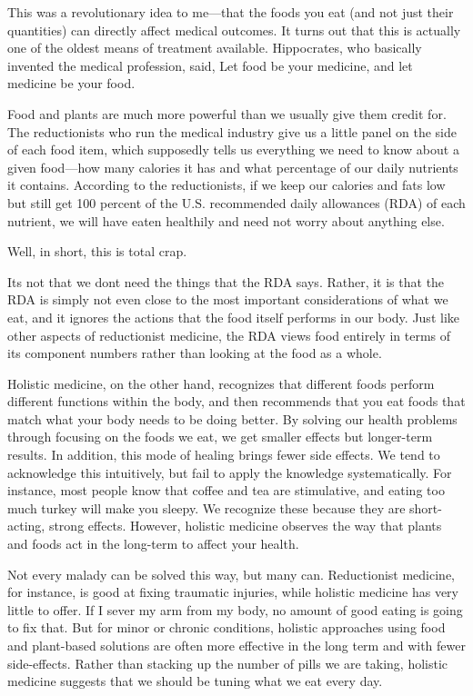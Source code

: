 This was a revolutionary idea to me—that the foods you eat (and not just
their quantities) can directly affect medical outcomes. It turns out
that this is actually one of the oldest means of treatment available.
Hippocrates, who basically invented the medical profession, said,
{\textquotedbl}Let food be your medicine, and let medicine be your
food.{\textquotedbl}  

Food and plants are much more powerful than we usually give them credit
for. The reductionists who run the medical industry give us a little
panel on the side of each food item, which supposedly tells us
everything we need to know about a given food—how many calories it has
and what percentage of our daily nutrients it contains. According to
the reductionists, if we keep our calories and fats low but still get
100 percent of the U.S. recommended daily allowances (RDA) of each
nutrient, we will have eaten healthily and need not worry about
anything else.

Well, in short, this is total crap.

It{\textquotesingle}s not that we don{\textquotesingle}t need the things
that the RDA says. Rather, it is that the RDA is simply not even close
to the most important considerations of what we eat, and it ignores the
actions that the food itself performs in our body. Just like other
aspects of reductionist medicine, the RDA views food entirely in terms
of its component numbers rather than looking at the food as a whole. 

Holistic medicine, on the other hand, recognizes that different foods
perform different functions within the body, and then recommends that
you eat foods that match what your body needs to be doing better. By
solving our health problems
through focusing on
the foods we eat, we get smaller effects but longer-term results. In
addition, this mode of healing brings fewer side effects.  We tend to
acknowledge this intuitively, but fail to apply the knowledge
systematically.  For instance, most people know that coffee and tea are
stimulative, and eating too much turkey will make you sleepy.  We
recognize these because they are short-acting, strong effects. 
However, holistic medicine observes the way that plants and foods act
in the long-term to affect your health.

Not every malady can be solved this way, but many can. Reductionist
medicine, for instance, is good at fixing traumatic injuries, while
holistic medicine has very little to offer. If I sever my arm from my
body, no amount of good eating is going to fix that. But for minor or
chronic conditions, holistic approaches using food and plant-based
solutions are often more effective in the long term
and with fewer
side-effects.  Rather than stacking up the number of pills we are
taking, holistic medicine suggests that we should be tuning what we eat
every day.

